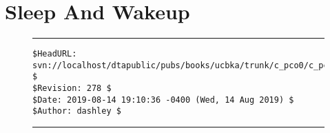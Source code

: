 \section{Sleep And Wakeup}



\vfill
\noindent\begin{figure}[!b]
\noindent\rule[-0.25in]{\textwidth}{1pt}
\begin{tiny}
\begin{verbatim}
$HeadURL: svn://localhost/dtapublic/pubs/books/ucbka/trunk/c_pco0/c_pco0.tex $
$Revision: 278 $
$Date: 2019-08-14 19:10:36 -0400 (Wed, 14 Aug 2019) $
$Author: dashley $
\end{verbatim}
\end{tiny}
\noindent\rule[0.25in]{\textwidth}{1pt}
\end{figure}

%
